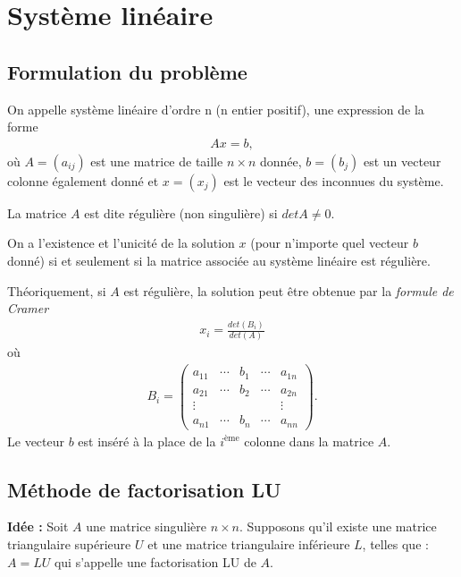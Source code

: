 \chapter{Système linéaire}
\section{Formulation du problème}
On appelle système linéaire d’ordre n (n entier positif), une expression de la 
forme 
\begin{eqnarray}
	Ax = b,
\end{eqnarray}
où $A = (a_{ij})$ est une matrice de taille $n \times n$ donnée, $b = (b_j)$ est un vecteur 
colonne également donné et $x = (x_j)$ est le vecteur des inconnues du système.

La matrice $A$ est dite régulière (non singulière) si $det A \neq 0$.

On a l’existence et l’unicité de la solution $x$ (pour n’importe quel vecteur $b$ donné) si et 
seulement si la matrice associée au système linéaire est régulière.

Théoriquement, si $A$ est régulière, la solution peut être obtenue par la \emph{formule de Cramer}
\begin{eqnarray}
	x_i=\frac{det(B_i)}{det(A)}
\end{eqnarray}
où
\begin{eqnarray*}
	B_i=
	\begin{pmatrix}
		a_{11} & \cdots & b_1 & \cdots & a_{1n}
		\\
		a_{21} & \cdots & b_2 & \cdots & a_{2n}
		\\
		\vdots & & & & \vdots
		\\
		a_{n1} & \cdots & b_n & \cdots & a_{nn}
	\end{pmatrix}.
\end{eqnarray*}
Le vecteur $b$ est inséré à la place de la $i^{\text{ème}}$ colonne dans la matrice $A$.
\section{Méthode de factorisation LU}
\textbf{Idée :} Soit $A$ une matrice singulière $n\times n$. Supposons qu’il existe une matrice triangulaire supérieure $U$ et une matrice triangulaire 
inférieure $L$, telles que :  $A = LU$ qui s’appelle une factorisation LU de $A$.
 
